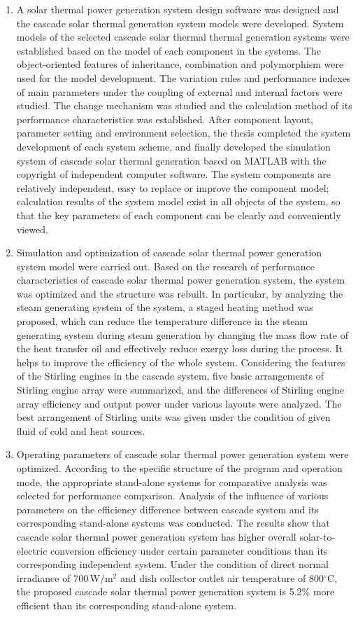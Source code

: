 \begin{enumerate}[label=(\arabic*)]
  \item A solar thermal power generation system design software was designed and the cascade solar thermal generation system models were developed. System models of the selected cascade solar thermal thermal generation systems were established based on the model of each component in the systems. The object-oriented features of inheritance, combination and polymorphism were used for the model development. The variation rules and performance indexes of main parameters under the coupling of external and internal factors were studied. The change mechanism was studied and the calculation method of its performance characteristics was established. After component layout, parameter setting and environment selection, the thesis completed the system development of each system scheme, and finally developed the simulation system of cascade solar thermal generation based on MATLAB with the copyright of independent computer software. The system components are relatively independent, easy to replace or improve the component model; calculation results of the system model exist in all objects of the system, so that the key parameters of each component can be clearly and conveniently viewed. 
  \item Simulation and optimization of cascade solar thermal power generation system model were carried out. Based on the research of performance characteristics of cascade solar thermal power generation system, the system was optimized and the structure was rebuilt. In particular, by analyzing the steam generating system of the system, a staged heating method was proposed, which can reduce the temperature difference in the steam generating system during steam generation by changing the mass flow rate of the heat transfer oil and  effectively reduce exergy loss during the process. It helps to improve the efficiency of the whole system. 
Considering the features of the Stirling engines in the cascade system, five basic arrangements of Stirling engine array were summarized, and the differences of Stirling engine array efficiency and output power under various layouts were analyzed. The best arrangement of Stirling units was given under the condition of given fluid of cold and heat sources.
	\item Operating parameters of cascade solar thermal power generation system were optimized. 
According to the specific structure of the program and operation mode, the appropriate stand-alone systems for comparative analysis was selected for performance comparison. Analysis of the influence of various parameters on the efficiency difference between cascade system and its corresponding stand-alone systems was conducted. The results show that cascade solar thermal power generation system has higher overall solar-to-electric conversion efficiency under certain parameter conditions than its corresponding independent system. Under the condition of direct normal irradiance of 700\,$\mathrm{W/m^2}$ and dish collector outlet air temperature of 800$\mathrm{^\circ C}$, the proposed cascade solar thermal power generation system is 5.2\% more efficient than its corresponding stand-alone system.

\end{enumerate}
